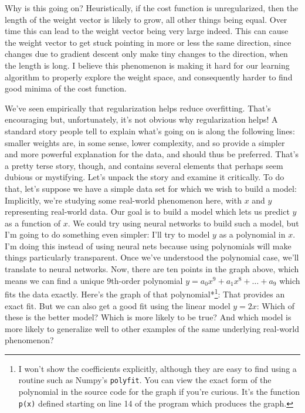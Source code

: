 Why is this going on? Heuristically, if the cost function is unregularized, then the length of the weight vector is likely to grow, all other things being equal. Over time this can lead to the weight vector being very large indeed. This can cause the weight vector to get stuck pointing in more or less the same direction, since changes due to gradient descent only make tiny changes to the direction, when the length is long. I believe this phenomenon is making it hard for our learning algorithm to properly explore the weight space, and consequently harder to find good minima of the cost function.





We've seen empirically that regularization helps reduce overfitting. That's encouraging but, unfortunately, it's not obvious why regularization helps! A standard story people tell to explain what's going on is along the following lines: smaller weights are, in some sense, lower complexity, and so provide a simpler and more powerful explanation for the data, and should thus be preferred. That's a pretty terse story, though, and contains several elements that perhaps seem dubious or mystifying. Let's unpack the story and examine it critically. To do that, let's suppose we have a simple data set for which we wish to build a model: Implicitly, we're studying some real-world phenomenon here, with $x$ and $y$ representing real-world data. Our goal is to build a model which lets us predict $y$ as a function of $x$. We could try using neural networks to build such a model, but I'm going to do something even simpler: I'll try to model $y$ as a polynomial in $x$. I'm doing this instead of using neural nets because using polynomials will make things particularly transparent. Once we've understood the polynomial case, we'll translate to neural networks. Now, there are ten points in the graph above, which means we can find a unique $9$th-order polynomial $y = a_0 x^9 + a_1 x^8 + \ldots + a_9$ which fits the data exactly. Here's the graph of that polynomial*\footnote{I won't show the coefficients explicitly, although they are easy to find using a routine such as Numpy's \texttt{polyfit}. You can view the exact form of the polynomial in the source code for the graph if you're curious. It's the function \texttt{p(x)} defined starting on line 14 of the program which produces the graph.}: That provides an exact fit. But we can also get a good fit using the linear model $y = 2x$: Which of these is the better model? Which is more likely to be true? And which model is more likely to generalize well to other examples of the same underlying real-world phenomenon?


